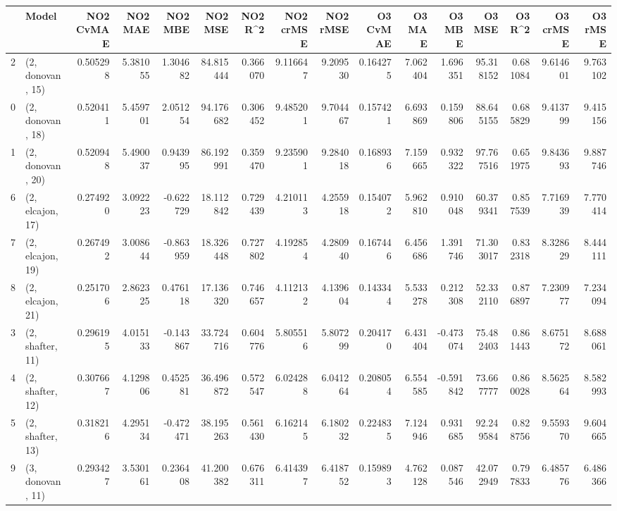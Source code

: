 \begin{tabular}{llrrrrrrrrrrrrrr}
\toprule
{} &             Model &  NO2 CvMAE &   NO2 MAE &   NO2 MBE &    NO2 MSE &   NO2 R\textasciicircum2 &  NO2 crMSE &  NO2 rMSE &  O3 CvMAE &     O3 MAE &    O3 MBE &      O3 MSE &    O3 R\textasciicircum2 &   O3 crMSE &    O3 rMSE \\
\midrule
2  &  (2, donovan, 15) &   0.505298 &  5.381055 &  1.304682 &  84.815444 &  0.366070 &   9.116647 &  9.209530 &  0.164275 &   7.062404 &  1.696351 &   95.318152 &  0.681084 &   9.614601 &   9.763102 \\
0  &  (2, donovan, 18) &   0.520411 &  5.459701 &  2.051254 &  94.176682 &  0.306452 &   9.485201 &  9.704467 &  0.157421 &   6.693869 &  0.159806 &   88.645155 &  0.685829 &   9.413799 &   9.415156 \\
1  &  (2, donovan, 20) &   0.520948 &  5.490037 &  0.943995 &  86.192991 &  0.359470 &   9.235901 &  9.284018 &  0.168936 &   7.159665 &  0.932322 &   97.767516 &  0.651975 &   9.843693 &   9.887746 \\
6  &  (2, elcajon, 17) &   0.274920 &  3.092223 & -0.622729 &  18.112842 &  0.729439 &   4.210113 &  4.255918 &  0.154072 &   5.962810 &  0.910048 &   60.379341 &  0.857539 &   7.716939 &   7.770414 \\
7  &  (2, elcajon, 19) &   0.267492 &  3.008644 & -0.863959 &  18.326448 &  0.727802 &   4.192854 &  4.280940 &  0.167446 &   6.456686 &  1.391746 &   71.303017 &  0.832318 &   8.328629 &   8.444111 \\
8  &  (2, elcajon, 21) &   0.251706 &  2.862325 &  0.476118 &  17.136320 &  0.746657 &   4.112132 &  4.139604 &  0.143344 &   5.533278 &  0.212308 &   52.332110 &  0.876897 &   7.230977 &   7.234094 \\
3  &  (2, shafter, 11) &   0.296195 &  4.015133 & -0.143867 &  33.724716 &  0.604776 &   5.805516 &  5.807299 &  0.204170 &   6.431404 & -0.473074 &   75.482403 &  0.861443 &   8.675172 &   8.688061 \\
4  &  (2, shafter, 12) &   0.307667 &  4.129806 &  0.452581 &  36.496872 &  0.572547 &   6.024288 &  6.041264 &  0.208054 &   6.554585 & -0.591842 &   73.667777 &  0.860028 &   8.562564 &   8.582993 \\
5  &  (2, shafter, 13) &   0.318216 &  4.295134 & -0.472471 &  38.195263 &  0.561430 &   6.162145 &  6.180232 &  0.224835 &   7.124946 &  0.931685 &   92.249584 &  0.828756 &   9.559370 &   9.604665 \\
9  &  (3, donovan, 11) &   0.293427 &  3.530161 &  0.236408 &  41.200382 &  0.676311 &   6.414397 &  6.418752 &  0.159893 &   4.762128 &  0.087546 &   42.072949 &  0.797833 &   6.485776 &   6.486366 \\

\end{tabular}
